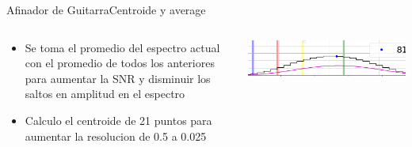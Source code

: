 \begin{frame}[t]{Afinador de Guitarra}{Centroide y average}
   \footnotesize
   \begin{columns}
      \begin{column}{.5\textwidth}
         \begin{itemize}
            \item{Se toma el promedio del espectro actual con el promedio de todos los anteriores para aumentar la SNR y disminuir los saltos en amplitud en el espectro}
            \item{Calculo el centroide de 21 puntos para aumentar la resolucion de 0.5 a 0.025}
         \end{itemize}
      
      
      \end{column}
      \begin{column}{.5\textwidth}
         \includegraphics[width=1.0\textwidth]{7_clase/centroide}
      \end{column}
   \end{columns}
   \vfill
   \note{
      \begin{itemize}
         \item{}
         \item{}
      \end{itemize}
   }
\end{frame}
